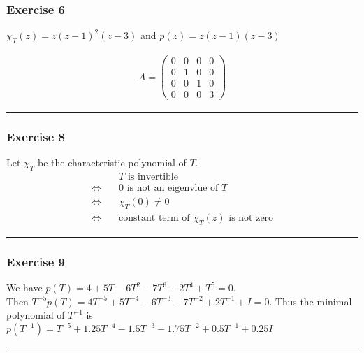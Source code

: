 \documentclass[12pt, letterpaper]{scrartcl}
\begin{document}
\subsubsection*{Exercise 6}
\begin{center}
$\chi_T(z)=z(z-1)^2(z-3)$ and $p(z)=z(z-1)(z-3)$
\end{center}
\begin{align*}
     A=
     \left(
     \begin{array}{cccc}
          0&0&0&0\\
          0&1&0&0\\
          0&0&1&0\\
          0&0&0&3
     \end{array}
     \right)
\end{align*}
\vskip1mm\hrule

\subsubsection*{Exercise 8}
Let $\chi_T$ be the characteristic polynomial of $T$.
\begin{align*}
    \quad&T\text{ is invertible}\\
    \Longleftrightarrow\quad&\text{0 is not an eigenvlue of }T\\
    \Longleftrightarrow\quad&\chi_T(0)\neq0\\
    \Longleftrightarrow\quad&\text{constant term of }\chi_T(z) \text{ is not zero}
\end{align*}
\vskip1mm\hrule

\subsubsection*{Exercise 9}
We have $p(T)=4+5T-6T^2-7T^3+2T^4+T^5=0$.\\Then $T^{-5}p(T)=4T^{-5}+5T^{-4}-6T^{-3}-7T^{-2}+2T^{-1}+I=0$. Thus the minimal polynomial of $T^{-1}$ is $p(T^{-1})=T^{-5}+1.25T^{-4}-1.5T^{-3}-1.75T^{-2}+0.5T^{-1}+0.25I$
\vskip1mm\hrule


\end{document}
